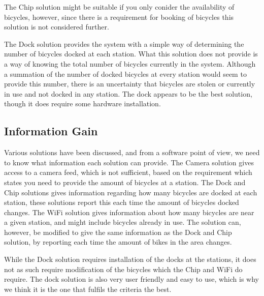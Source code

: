 The Chip solution might be suitable if you only conider the availability of bicycles, however, since there is a requirement for booking of bicycles this solution is not considered further.

The Dock solution provides the system with a simple way of determining the number of bicycles docked at each station.
What this solution does not provide is a way of knowing the total number of bicycles currently in the system.
Although a summation of the number of docked bicycles at every station would seem to provide this number, there is an uncertainty that bicycles are stolen or currently in use and not docked in any station.
The dock appears to be the best solution, though it does require some hardware installation.

\subsection{Information Gain}
Various solutions have been discussed, and from a software point of view, we need to know what information each solution can provide.
The Camera solution gives access to a camera feed, which is not sufficient, based on the requirement which states you need to provide the amount of bicycles at a station.
The Dock and Chip solutions gives information regarding how many bicycles are docked at each station, these solutions report this each time the amount of bicycles docked changes.
The WiFi solution gives information about how many bicycles are near a given station, and might include bicycles already in use.
The solution can, however, be modified to give the same information as the Dock and Chip solution, by reporting each time the amount of bikes in the area changes.

While the Dock solution requires installation of the docks at the stations, it does not as such require modification of the bicycles which the Chip and WiFi do require. 
The dock solution is also very user friendly and easy to use, which is why we think it is the one that fulfils the criteria the best.